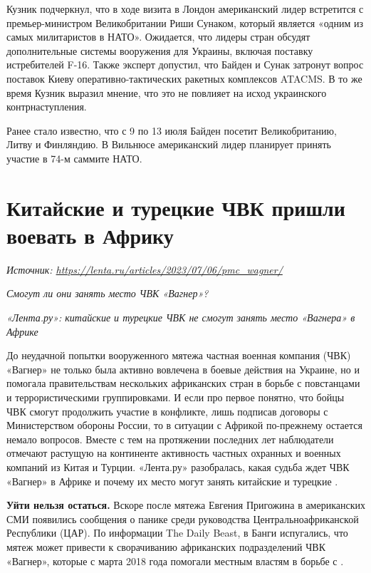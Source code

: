 Кузник подчеркнул, что в ходе визита в Лондон американский лидер встретится с премьер-министром Великобритании Риши Сунаком, который является «одним из самых  милитаристов в НАТО». Ожидается, что лидеры стран обсудят дополнительные системы вооружения для Украины, включая поставку истребителей F-16. Также эксперт допустил, что Байден и Сунак затронут вопрос поставок Киеву оперативно-тактических ракетных комплексов ATACMS. В то же время Кузник выразил мнение, что это не повлияет на исход украинского контрнаступления.

Ранее стало известно, что с 9 по 13 июля Байден посетит Великобританию, Литву и Финляндию. В Вильнюсе американский лидер планирует принять участие в 74-м саммите НАТО.

\newpage
\section{Китайские и турецкие ЧВК пришли воевать в Африку}

\textit{Источник: \url{https://lenta.ru/articles/2023/07/06/pmc_wagner/}}

\textit{Смогут ли они занять место ЧВК «Вагнер»?}

\textit{«Лента.ру»: китайские и турецкие ЧВК не смогут занять место «Вагнера» в Африке}

До неудачной попытки вооруженного мятежа частная военная компания (ЧВК) «Вагнер» не только была активно вовлечена в боевые действия на Украине, но и помогала правительствам нескольких африканских стран в борьбе с повстанцами и террористическими группировками. И если про первое понятно, что бойцы ЧВК смогут продолжить участие в конфликте, лишь подписав договоры с Министерством обороны России, то в ситуации с Африкой по-прежнему остается немало вопросов. Вместе с тем на протяжении последних лет наблюдатели отмечают растущую на континенте активность частных охранных и военных компаний из Китая и Турции. «Лента.ру» разобралась, какая судьба ждет  ЧВК «Вагнер» в Африке и почему их место могут занять китайские и турецкие .

\textbf{Уйти нельзя остаться.} Вскоре после мятежа Евгения Пригожина в американских СМИ появились сообщения о панике среди руководства Центральноафриканской Республики (ЦАР). По информации The Daily Beast, в Банги испугались, что мятеж может привести к сворачиванию африканских подразделений ЧВК «Вагнер», которые с марта 2018 года помогали местным властям в борьбе с .


